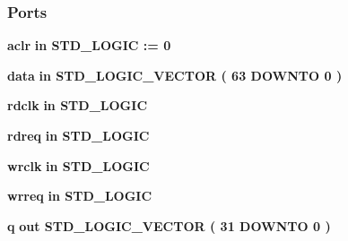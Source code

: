 \subsubsection*{Ports}
 \begin{DoxyCompactItemize}
\item 
{\bf aclr}  {\bfseries {\bfseries \textcolor{keywordflow}{in}\textcolor{vhdlchar}{ }}} {\bfseries \textcolor{comment}{S\+T\+D\+\_\+\+L\+O\+G\+IC}\textcolor{vhdlchar}{ }\textcolor{vhdlchar}{ }\textcolor{vhdlchar}{\+:}\textcolor{vhdlchar}{=}\textcolor{vhdlchar}{ }\textcolor{vhdlchar}{ }\textcolor{vhdlchar}{\textquotesingle{}}\textcolor{vhdlchar}{ } \textcolor{vhdldigit}{0} \textcolor{vhdlchar}{ }\textcolor{vhdlchar}{\textquotesingle{}}\textcolor{vhdlchar}{ }} 
\item 
{\bf data}  {\bfseries {\bfseries \textcolor{keywordflow}{in}\textcolor{vhdlchar}{ }}} {\bfseries \textcolor{comment}{S\+T\+D\+\_\+\+L\+O\+G\+I\+C\+\_\+\+V\+E\+C\+T\+OR}\textcolor{vhdlchar}{ }\textcolor{vhdlchar}{(}\textcolor{vhdlchar}{ }\textcolor{vhdlchar}{ } \textcolor{vhdldigit}{63} \textcolor{vhdlchar}{ }\textcolor{keywordflow}{D\+O\+W\+N\+TO}\textcolor{vhdlchar}{ }\textcolor{vhdlchar}{ } \textcolor{vhdldigit}{0} \textcolor{vhdlchar}{ }\textcolor{vhdlchar}{)}\textcolor{vhdlchar}{ }} 
\item 
{\bf rdclk}  {\bfseries {\bfseries \textcolor{keywordflow}{in}\textcolor{vhdlchar}{ }}} {\bfseries \textcolor{comment}{S\+T\+D\+\_\+\+L\+O\+G\+IC}\textcolor{vhdlchar}{ }} 
\item 
{\bf rdreq}  {\bfseries {\bfseries \textcolor{keywordflow}{in}\textcolor{vhdlchar}{ }}} {\bfseries \textcolor{comment}{S\+T\+D\+\_\+\+L\+O\+G\+IC}\textcolor{vhdlchar}{ }} 
\item 
{\bf wrclk}  {\bfseries {\bfseries \textcolor{keywordflow}{in}\textcolor{vhdlchar}{ }}} {\bfseries \textcolor{comment}{S\+T\+D\+\_\+\+L\+O\+G\+IC}\textcolor{vhdlchar}{ }} 
\item 
{\bf wrreq}  {\bfseries {\bfseries \textcolor{keywordflow}{in}\textcolor{vhdlchar}{ }}} {\bfseries \textcolor{comment}{S\+T\+D\+\_\+\+L\+O\+G\+IC}\textcolor{vhdlchar}{ }} 
\item 
{\bf q}  {\bfseries {\bfseries \textcolor{keywordflow}{out}\textcolor{vhdlchar}{ }}} {\bfseries \textcolor{comment}{S\+T\+D\+\_\+\+L\+O\+G\+I\+C\+\_\+\+V\+E\+C\+T\+OR}\textcolor{vhdlchar}{ }\textcolor{vhdlchar}{(}\textcolor{vhdlchar}{ }\textcolor{vhdlchar}{ } \textcolor{vhdldigit}{31} \textcolor{vhdlchar}{ }\textcolor{keywordflow}{D\+O\+W\+N\+TO}\textcolor{vhdlchar}{ }\textcolor{vhdlchar}{ } \textcolor{vhdldigit}{0} \textcolor{vhdlchar}{ }\textcolor{vhdlchar}{)}\textcolor{vhdlchar}{ }} 

\end{DoxyCompactItemize}
